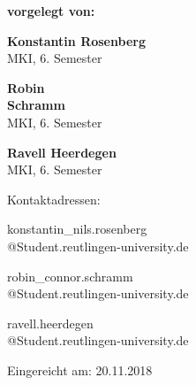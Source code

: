 \begin{titlepage}
\begin{center}
\textbf{vorgelegt von:\\}
\vspace*{0.2cm}
\begin{minipage}[H]{4cm}
\centering
{\large \textbf{Konstantin Rosenberg}}\\
MKI, 6. Semester
\end{minipage}
\hfill
\begin{minipage}[H]{4cm}
\centering
{\large \textbf{Robin\\ Schramm}}\\
MKI, 6. Semester
\end{minipage}
\hfill
\begin{minipage}[H]{4cm}
\centering
{\large \textbf{Ravell Heerdegen}}\\
MKI, 6. Semester
\end{minipage}

\vspace*{0.6cm}

Kontaktadressen:\\

\vspace*{0.3cm}
\begin{minipage}[H]{4cm}
\centering
{\normalsize konstantin\_nils.rosenberg\\@Student.reutlingen-university.de}
\\
\end{minipage}
\hfill
\begin{minipage}[H]{4cm}
\centering
{\normalsize robin\_connor.schramm\\@Student.reutlingen-university.de}\\
\end{minipage}
\hfill
\begin{minipage}[H]{4cm}
\centering
{\normalsize ravell.heerdegen\\@Student.reutlingen-university.de}
\\
\end{minipage}

\vspace*{0.8cm}

Eingereicht am:	20.11.2018



\end{center}

\end{titlepage}